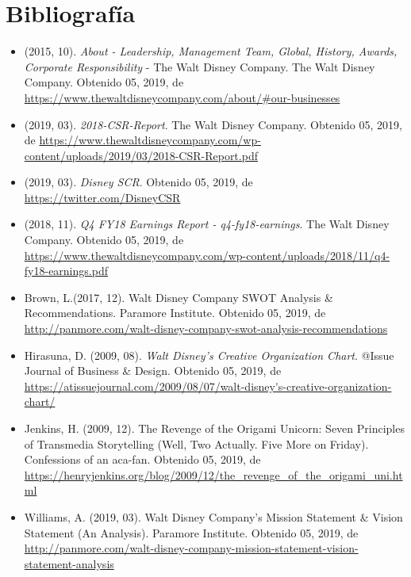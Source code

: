 \section{Bibliografía}

\begin{itemize}

\item
(2015, 10). \textit{About - Leadership, Management Team, Global, History, Awards, Corporate Responsibility} - The Walt Disney Company. The Walt Disney Company. Obtenido 05, 2019, de \url{https://www.thewaltdisneycompany.com/about/#our-businesses}

\item
(2019, 03). \textit{2018-CSR-Report}. The Walt Disney Company. Obtenido 05, 2019, de \url{https://www.thewaltdisneycompany.com/wp-content/uploads/2019/03/2018-CSR-Report.pdf}

\item
(2019, 03). \textit{Disney SCR}. Obtenido 05, 2019, de \url{https://twitter.com/DisneyCSR}

\item
(2018, 11). \textit{Q4 FY18 Earnings Report - q4-fy18-earnings}. The Walt Disney Company. Obtenido 05, 2019, de \url{https://www.thewaltdisneycompany.com/wp-content/uploads/2018/11/q4-fy18-earnings.pdf}

\item
Brown, L.(2017, 12). Walt Disney Company SWOT Analysis \& Recommendations. Paramore Institute. Obtenido 05, 2019, de \url{http://panmore.com/walt-disney-company-swot-analysis-recommendations}

\item
Hirasuna, D. (2009, 08). \textit{Walt Disney’s Creative Organization Chart}. @Issue Journal of Business \& Design. Obtenido 05, 2019, de \url{https://atissuejournal.com/2009/08/07/walt-disney's-creative-organization-chart/}

\item
Jenkins, H. (2009, 12). The Revenge of the Origami Unicorn: Seven Principles of Transmedia Storytelling (Well, Two Actually. Five More on Friday). Confessions of an aca-fan. Obtenido 05, 2019, de \url{https://henryjenkins.org/blog/2009/12/the_revenge_of_the_origami_uni.html}

\item
Williams, A. (2019, 03). Walt Disney Company’s Mission Statement \& Vision Statement (An Analysis). Paramore Institute. Obtenido 05, 2019, de \url{http://panmore.com/walt-disney-company-mission-statement-vision-statement-analysis}


\end{itemize}